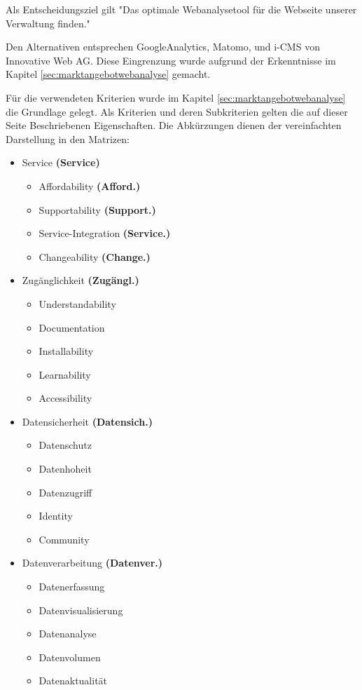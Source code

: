 Als Entscheidungsziel gilt "Das optimale Webanalysetool für die Webseite unserer Verwaltung finden."

Den Alternativen entsprechen GoogleAnalytics, Matomo, und i-CMS von Innovative Web AG. Diese Eingrenzung wurde aufgrund der Erkenntnisse im Kapitel \ref{sec:marktangebotwebanalyse} gemacht. 

\newpage
Für die verwendeten Kriterien wurde im Kapitel \ref{sec:marktangebotwebanalyse} die Grundlage gelegt. Als Kriterien und deren Subkriterien gelten die auf dieser Seite Beschriebenen Eigenschaften. Die Abkürzungen dienen der vereinfachten Darstellung in den Matrizen:

\begin{itemize}
  \item Service \textbf{(Service)} \begin{itemize}
    \item Affordability  \textbf{(Afford.)}
    \item Supportability \textbf{(Support.)}
    \item Service-Integration \textbf{(Service.)}
    \item Changeability \textbf{(Change.)}
  \end{itemize}
  \item Zugänglichkeit \textbf{(Zugängl.)} \begin{itemize}
    \item Understandability
    \item Documentation
    \item Installability
    \item Learnability
    \item Accessibility
  \end{itemize}
  \item Datensicherheit \textbf{(Datensich.)} \begin{itemize}
    \item Datenschutz
    \item Datenhoheit
    \item Datenzugriff
    \item Identity
    \item Community
  \end{itemize}
  \item Datenverarbeitung \textbf{(Datenver.)} \begin{itemize}
    \item Datenerfassung
    \item Datenvisualisierung
    \item Datenanalyse
    \item Datenvolumen
    \item Datenaktualität
  \end{itemize}
\end{itemize}
\newpage

